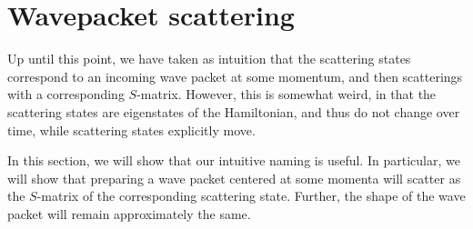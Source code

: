 \documentclass[../thesis-main/thesis-main]{subfiles}
\begin{document}
%
%


\section{Wavepacket scattering}

Up until this point, we have taken as intuition that the scattering states correspond to an incoming wave packet at some momentum, and then scatterings with a corresponding $S$-matrix.  However, this is somewhat weird, in that the scattering states are eigenstates of the Hamiltonian, and thus do not change over time, while scattering states explicitly move.  

In this section, we will show that our intuitive naming is useful.  In particular, we will show that preparing a wave packet centered at some momenta will scatter as the $S$-matrix of the corresponding scattering state.  Further, the shape of the wave packet will remain approximately the same.
\end{document}
